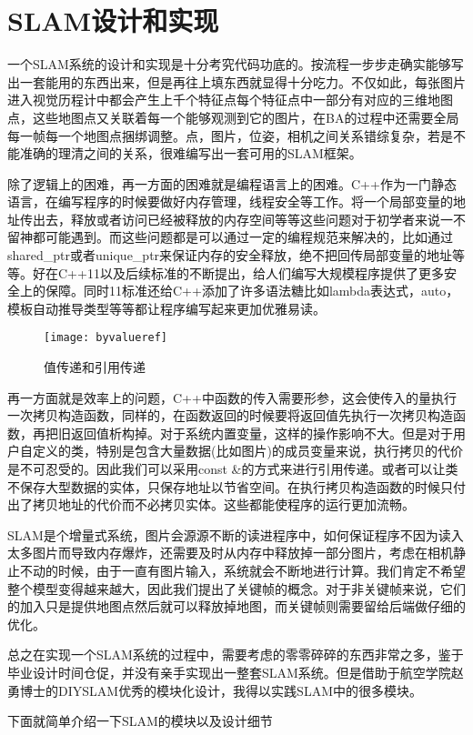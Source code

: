 \chapter{SLAM设计和实现}
一个SLAM系统的设计和实现是十分考究代码功底的。按流程一步步走确实能够写出一套能用的东西出来，但是再往上填东西就显得十分吃力。不仅如此，每张图片进入视觉历程计中都会产生上千个特征点每个特征点中一部分有对应的三维地图点，这些地图点又关联着每一个能够观测到它的图片，在BA的过程中还需要全局每一帧每一个地图点捆绑调整。点，图片，位姿，相机之间关系错综复杂，若是不能准确的理清之间的关系，很难编写出一套可用的SLAM框架。\par
除了逻辑上的困难，再一方面的困难就是编程语言上的困难。C++作为一门静态语言，在编写程序的时候要做好内存管理，线程安全等工作。将一个局部变量的地址传出去，释放或者访问已经被释放的内存空间等等这些问题对于初学者来说一不留神都可能遇到。而这些问题都是可以通过一定的编程规范来解决的，比如通过shared\_ptr或者unique\_ptr来保证内存的安全释放，绝不把回传局部变量的地址等等。好在C++11以及后续标准的不断提出，给人们编写大规模程序提供了更多安全上的保障。同时11标准还给C++添加了许多语法糖比如lambda表达式，auto，模板自动推导类型等等都让程序编写起来更加优雅易读。\par
\begin{figure}[H]
	\centering
	\texttt{[image: byvalueref]}
	\caption{值传递和引用传递}
\end{figure}
再一方面就是效率上的问题，C++中函数的传入需要形参，这会使传入的量执行一次拷贝构造函数，同样的，在函数返回的时候要将返回值先执行一次拷贝构造函数，再把旧返回值析构掉。对于系统内置变量，这样的操作影响不大。但是对于用户自定义的类，特别是包含大量数据(比如图片)的成员变量来说，执行拷贝的代价是不可忍受的。因此我们可以采用const \&的方式来进行引用传递。或者可以让类不保存大型数据的实体，只保存地址以节省空间。在执行拷贝构造函数的时候只付出了拷贝地址的代价而不必拷贝实体。这些都能使程序的运行更加流畅。\par
SLAM是个增量式系统，图片会源源不断的读进程序中，如何保证程序不因为读入太多图片而导致内存爆炸，还需要及时从内存中释放掉一部分图片，考虑在相机静止不动的时候，由于一直有图片输入，系统就会不断地进行计算。我们肯定不希望整个模型变得越来越大，因此我们提出了关键帧的概念。对于非关键帧来说，它们的加入只是提供地图点然后就可以释放掉地图，而关键帧则需要留给后端做仔细的优化。\par
总之在实现一个SLAM系统的过程中，需要考虑的零零碎碎的东西非常之多，鉴于毕业设计时间仓促，并没有亲手实现出一整套SLAM系统。但是借助于航空学院赵勇博士的DIYSLAM\cite{zhao2019gslam}优秀的模块化设计，我得以实践SLAM中的很多模块。\par
下面就简单介绍一下SLAM的模块以及设计细节
